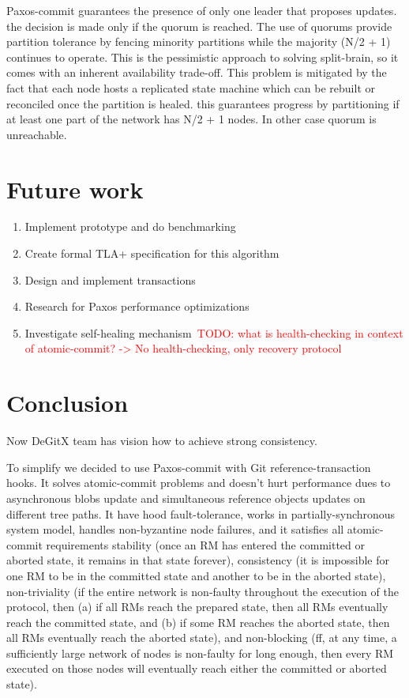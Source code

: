 \documentclass[sigplan, screen, nonacm, 11pt]{acmart}
\newcommand{\todo}[1]{\textcolor{red}{TODO: #1}}
\begin{document}
Paxos-commit guarantees the presence of only one leader that proposes updates.
the decision is made only if the quorum is reached.
The use of quorums provide partition tolerance by fencing minority partitions while the majority (N/2 + 1) continues to operate.
This is the pessimistic approach to solving split-brain,
so it comes with an inherent availability trade-off.
This problem is mitigated by the fact that each node hosts a replicated state machine which can be rebuilt or reconciled once the partition is healed.
this guarantees progress by partitioning if at least one part of the network has N/2 + 1 nodes. In other case quorum is unreachable.

\section{Future work}

\begin{enumerate}
  \item Implement prototype and do benchmarking
  \item Create formal TLA+ specification for this algorithm
  \item Design and implement transactions
  \item Research for Paxos performance optimizations
  \item Investigate self-healing mechanism~\todo{what is health-checking in context of atomic-commit? -> No health-checking, only recovery protocol}
\end{enumerate}

\section{Conclusion}

Now DeGitX team has vision how to achieve strong consistency.

To simplify we decided to use Paxos-commit with Git reference-transaction hooks.
It solves atomic-commit problems and doesn't hurt performance dues to asynchronous blobs update
and simultaneous reference objects updates on different tree paths.
It have hood fault-tolerance, works in partially-synchronous system model,
handles non-byzantine node failures, and it satisfies all atomic-commit requirements
stability (once an RM has entered the committed or aborted state, it remains in that state forever),
consistency (it is impossible for one RM to be in the committed state and another to be in
the aborted state),
non-triviality (if the entire network is non-faulty throughout the execution of the protocol,
then (a) if all RMs reach the prepared state, then all RMs eventually reach the committed state,
and (b) if some RM reaches the aborted state,  then all RMs eventually reach the aborted state),
and non-blocking (ff, at any time, a sufficiently large network of nodes is non-faulty for long enough,
then every RM executed on those nodes will eventually reach either the committed or aborted state).

\newpage



\end{document}
